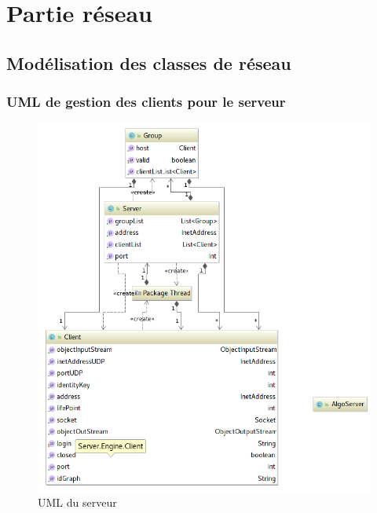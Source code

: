 \documentclass[a4paper,11pt]{report}
\title{}
\author{}
\begin{document}
\maketitle
\tableofcontents

\begin{abstract}
\end{abstract}

\chapter{Partie réseau}

\section{Modélisation des classes de réseau}

\subsection{UML de gestion des clients pour le serveur}

    \begin{figure}[th]
      \begin{center}
        \includegraphics[scale=0.6]{Assets/UML_serveur.png}
        \caption{UML du serveur}
        \label{UML du serveur}
      \end{center}
    \end{figure}
    
\end{document}

